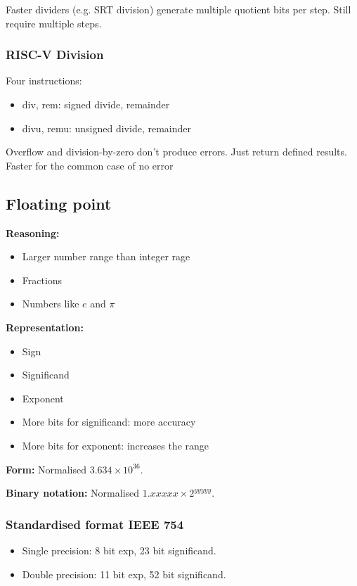 Faster dividers (e.g. SRT division) generate multiple quotient bits per step. Still require multiple steps. 

\subsubsection{RISC-V Division}
Four instructions:
\begin{itemize}
    \item div, rem: signed divide, remainder
    \item divu, remu: unsigned divide, remainder
\end{itemize}

Overflow and division-by-zero don’t produce errors. Just return defined results. Faster for the common case of no error

\subsection{Floating point}
\textbf{Reasoning:}
\begin{itemize}
    \item Larger number range than integer rage
    \item Fractions
    \item Numbers like $e$ and $\pi$
\end{itemize}

\textbf{Representation:}
\begin{itemize}
    \item Sign
    \item Significand
    \item Exponent
    \item More bits for significand: more accuracy
    \item More bits for exponent: increases the range
\end{itemize}

\textbf{Form:} Normalised $3.634\times 10^{36}$. 

\textbf{Binary notation:} Normalised $1.xxxxx \times 2^{yyyyy}$. 

\subsubsection{Standardised format IEEE 754} 
\begin{itemize}
    \item Single precision: 8 bit exp, 23 bit significand. 
    \item Double precision: 11 bit exp, 52 bit significand. 
\end{itemize}

